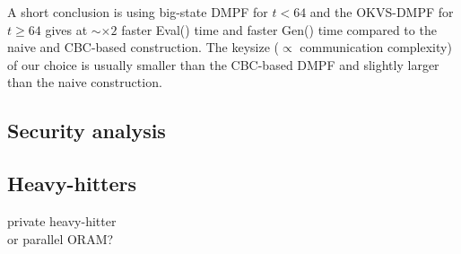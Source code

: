 A short conclusion is using big-state DMPF for $t<64$ and the OKVS-DMPF for $t\ge 64$ gives at $\sim \times 2$ faster Eval() time and faster Gen() time compared to the naive and CBC-based construction. The keysize ($\propto$ communication complexity) of our choice is usually smaller than the CBC-based DMPF and slightly larger than the naive construction. 
\subsection{Security analysis}
\subsection{Heavy-hitters}
private heavy-hitter\\
or parallel ORAM?